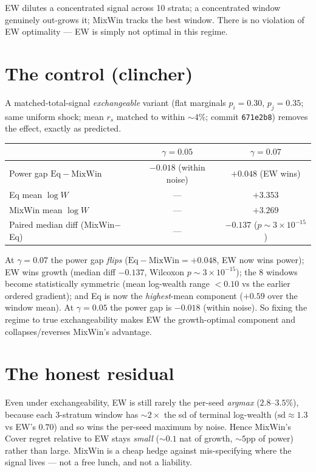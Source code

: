 \documentclass[11pt]{article}
\begin{document}
EW dilutes a concentrated signal across 10 strata; a concentrated window
genuinely out-grows it; MixWin tracks the best window. There is no violation of
EW optimality --- EW is simply not optimal in this regime.

\section{The control (clincher)}

A matched-total-signal \emph{exchangeable} variant (flat marginals
$p_i=0.30$, $p_j=0.35$; same uniform shock; mean $r_s$ matched to within
$\sim 4\%$; commit \texttt{671e2b8}) removes the effect, exactly as predicted.

\begin{table}[h]
\centering
\begin{tabular}{lcc}
\toprule
 & $\gamma=0.05$ & $\gamma=0.07$ \\
\midrule
Power gap $\mathrm{Eq}-\mathrm{MixWin}$ & $-0.018$ (within noise) & $+0.048$ (EW wins) \\
Eq mean $\log W$ & --- & $+3.353$ \\
MixWin mean $\log W$ & --- & $+3.269$ \\
Paired median diff (MixWin$-$Eq) & --- & $-0.137$ ($p\sim 3\times10^{-15}$) \\
\bottomrule
\end{tabular}
\end{table}

\noindent At $\gamma=0.07$ the power gap \emph{flips} ($\mathrm{Eq}-\mathrm{MixWin}=+0.048$,
EW now wins power); EW wins growth (median diff $-0.137$, Wilcoxon
$p\sim 3\times10^{-15}$); the 8 windows become statistically symmetric
(mean log-wealth range $<0.10$ vs the earlier ordered gradient); and Eq is now
the \emph{highest}-mean component ($+0.59$ over the window mean). At
$\gamma=0.05$ the power gap is $-0.018$ (within noise). So fixing the regime to
true exchangeability makes EW the growth-optimal component and
collapses/reverses MixWin's advantage.

\section{The honest residual}

Even under exchangeability, EW is still rarely the per-seed \emph{argmax}
($2.8$--$3.5\%$), because each 3-stratum window has $\sim 2\times$ the
sd of terminal log-wealth ($\mathrm{sd}\approx 1.3$ vs EW's $0.70$) and so wins the
per-seed maximum by noise. Hence MixWin's Cover regret relative to EW stays
\emph{small} ($\sim 0.1$ nat of growth, $\sim 5$pp of power) rather than large.
MixWin is a cheap hedge against mis-specifying where the signal lives --- not a
free lunch, and not a liability.
\end{document}
